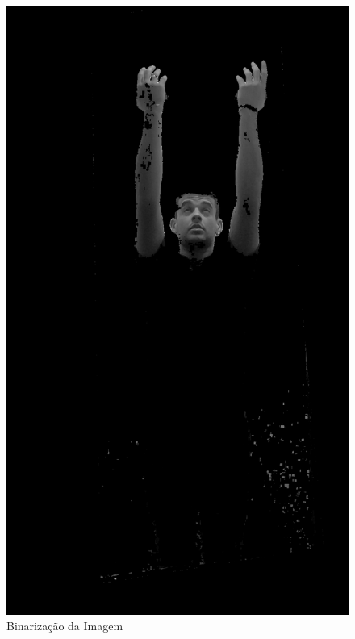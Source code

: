 \begin{figure}[H]
    \centering
    \caption{Binarização da Imagem}
        \begin{minipage}{\sizeImg\textwidth}
            \includegraphics[width=\textwidth]{figuras/mao_barra/gray.png}
        \end{minipage}
        \begin{minipage}{\sizeImg\textwidth}

\end{minipage}
\end{figure}
